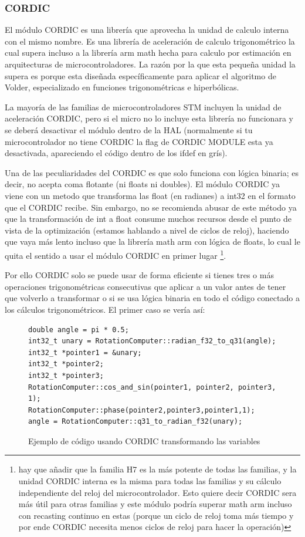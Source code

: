 \documentclass{report}
\begin{document}
\subsubsection{CORDIC}
El módulo CORDIC es una librería que aprovecha la unidad de calculo interna con el mismo nombre. Es una librería de aceleración de calculo trigonométrico la cual supera incluso a la librería arm math hecha para calculo por estimación en arquitecturas de microcontroladores. La razón por la que esta pequeña unidad la supera es porque esta diseñada específicamente para aplicar el algoritmo de Volder, especializado en funciones trigonométricas e hiperbólicas. \par
La mayoría de las familias de microcontroladores STM incluyen la unidad de aceleración CORDIC, pero si el micro no lo incluye esta librería no funcionara y se deberá desactivar el módulo dentro de la HAL (normalmente si tu microcontrolador no tiene CORDIC la flag de CORDIC MODULE esta ya desactivada, apareciendo el código dentro de los ifdef en grís).
\par \vspace{0.3cm}
Una de las peculiaridades del CORDIC es que solo funciona con lógica binaria; es decir, no acepta coma flotante (ni floats ni doubles). El módulo CORDIC ya viene con un metodo que transforma las float (en radianes) a int32 en el formato que el CORDIC recibe. Sin embargo, no se recomienda abusar de este método ya que la transformación de int a float consume muchos recursos desde el punto de vista de la optimización (estamos hablando a nivel de ciclos de reloj), haciendo que vaya más lento incluso que la librería math arm con lógica de floats, lo cual le quita el sentido a usar el módulo CORDIC en primer lugar \footnote{hay que añadir que la familia H7 es la más potente de todas las familias, y la unidad CORDIC interna es la misma para todas las familias y su cálculo independiente del reloj del microcontrolador. Esto quiere decir CORDIC sera más útil para otras familias y este módulo podría superar math arm incluso con recasting continuo en estas (porque un ciclo de reloj toma más tiempo y por ende CORDIC necesita menos ciclos de reloj para hacer la operación)}. \par
Por ello CORDIC solo se puede usar de forma eficiente si tienes tres o más operaciones trigonométricas consecutivas que aplicar a un valor antes de tener que volverlo a transformar o si se usa lógica binaria en todo el código conectado a los cálculos trigonométricos. El primer caso se vería así:
\begin{figure}[h]
\begin{lstlisting}
double angle = pi * 0.5;
int32_t unary = RotationComputer::radian_f32_to_q31(angle); 
int32_t *pointer1 = &unary;
int32_t *pointer2;
int32_t *pointer3;
RotationComputer::cos_and_sin(pointer1, pointer2, pointer3, 1);
RotationComputer::phase(pointer2,pointer3,pointer1,1);
angle = RotationComputer::q31_to_radian_f32(unary);
\end{lstlisting} 
\caption{Ejemplo de código usando CORDIC transformando las variables}
  \label{CORDICwCastcode}
\end{figure}
\end{document}
